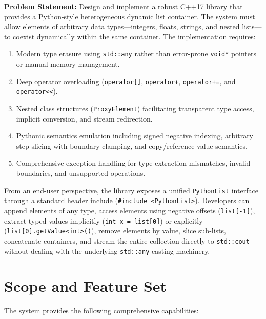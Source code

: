 \documentclass[12pt,a4paper]{report}
\begin{document}
\textbf{Problem Statement:} Design and implement a robust C++17 library that provides a Python-style heterogeneous dynamic list container. The system must allow elements of arbitrary data types---integers, floats, strings, and nested lists---to coexist dynamically within the same container. The implementation requires:
\begin{enumerate}
    \item Modern type erasure using \texttt{std::any} rather than error-prone \texttt{void*} pointers or manual memory management.
    \item Deep operator overloading (\texttt{operator[]}, \texttt{operator+}, \texttt{operator+=}, and \texttt{operator<<}).
    \item Nested class structures (\texttt{ProxyElement}) facilitating transparent type access, implicit conversion, and stream redirection.
    \item Pythonic semantics emulation including signed negative indexing, arbitrary step slicing with boundary clamping, and copy/reference value semantics.
    \item Comprehensive exception handling for type extraction mismatches, invalid boundaries, and unsupported operations.
\end{enumerate}

From an end-user perspective, the library exposes a unified \texttt{PythonList} interface through a standard header include (\texttt{\#include <PythonList>}). Developers can append elements of any type, access elements using negative offsets (\texttt{list[-1]}), extract typed values implicitly (\texttt{int x = list[0]}) or explicitly (\texttt{list[0].getValue<int>()}), remove elements by value, slice sub-lists, concatenate containers, and stream the entire collection directly to \texttt{std::cout} without dealing with the underlying \texttt{std::any} casting machinery.

\section{Scope and Feature Set}

The system provides the following comprehensive capabilities:
\end{document}
